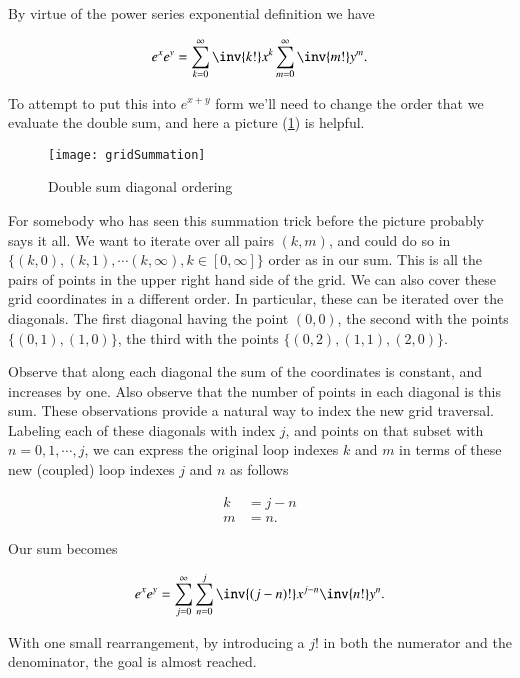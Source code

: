By virtue of the power series exponential definition we have

\begin{align}\label{eqn:exponentialCommutation:3}
e^{x} e^{y} = 
\sum_{k=0}^\infty \inv{k!} x^k
\sum_{m=0}^\infty \inv{m!} y^m.
\end{align}

To attempt to put this into $e^{x + y}$ form we'll need to change the order that we evaluate the double sum, and here a picture (\ref{fig:gridSummation}) is helpful.

\begin{figure}[htp]
\centering
\texttt{[image: gridSummation]}
\caption{Double sum diagonal ordering}\label{fig:gridSummation}
\end{figure}

For somebody who has seen this summation trick before the picture probably says it all.  We want to iterate over all pairs $(k, m)$, and could do so in $\{(k, 0), (k, 1), \cdots (k, \infty), k \in [0, \infty] \}$ order as in our sum.  This is all the pairs of points in the upper right hand side of the grid.  We can also cover these grid coordinates in a different order.  In particular, these can be iterated over the diagonals.  The first diagonal having the point $(0,0)$, the second with the points $\{(0, 1), (1, 0)\}$, the third with the points $\{(0, 2), (1, 1), (2, 0)\}$.

Observe that along each diagonal the sum of the coordinates is constant, and increases by one.  Also observe that the number of points in each diagonal is this sum.  These observations provide a natural way to index the new grid traversal.  Labeling each of these diagonals with index $j$, and points on that subset with $n=0,1,\cdots, j$, we can express the original loop indexes $k$ and $m$ in terms of these new (coupled) loop indexes $j$ and $n$ as follows

\begin{align}\label{eqn:exponentialCommutation:4}
k &= j - n \\
m &= n.
\end{align}

Our sum becomes

\begin{align}\label{eqn:exponentialCommutation:5}
e^{x} e^{y} = 
\sum_{j=0}^\infty \sum_{n=0}^j
\inv{(j-n)!} x^{j-n}
\inv{n!} y^n.
\end{align}

With one small rearrangement, by introducing a $j!$ in both the numerator and the denominator, the goal is almost reached.

